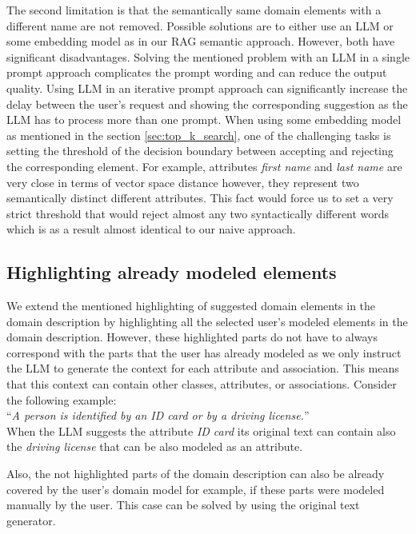 The second limitation is that the semantically same domain elements with a different name are not removed. Possible solutions are to either use an LLM or some embedding model as in our RAG semantic approach. However, both have significant disadvantages. Solving the mentioned problem with an LLM in a single prompt approach complicates the prompt wording and can reduce the output quality. Using LLM in an iterative prompt approach can significantly increase the delay between the user's request and showing the corresponding suggestion as the LLM has to process more than one prompt. When using some embedding model as mentioned in the section \ref{sec:top_k_search}, one of the challenging tasks is setting the threshold of the decision boundary between accepting and rejecting the corresponding element. For example, attributes \textit{first name} and \textit{last name} are very close in terms of vector space distance however, they represent two semantically distinct different attributes. This fact would force us to set a very strict threshold that would reject almost any two syntactically different words which is as a result almost identical to our naive approach.


\subsection{Highlighting already modeled elements}

We extend the mentioned highlighting of suggested domain elements in the domain description by highlighting all the selected user's modeled elements in the domain description. However, these highlighted parts do not have to always correspond with the parts that the user has already modeled as we only instruct the LLM to generate the context for each attribute and association. This means that this context can contain other classes, attributes, or associations. Consider the following example: \\

\noindent{} ``\textit{A person is identified by an ID card or by a driving license.}'' \\

\noindent{} When the LLM suggests the attribute \textit{ID card} its original text can contain also the \textit{driving license} that can be also modeled as an attribute.

Also, the not highlighted parts of the domain description can also be already covered by the user's domain model for example, if these parts were modeled manually by the user. This case can be solved by using the original text generator.


